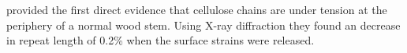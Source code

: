 \citet{Clair_2006} provided the first direct evidence that cellulose chains are under tension at the periphery of a normal wood stem. Using X-ray diffraction they found an decrease in repeat length of 0.2\% when the surface strains were released. 